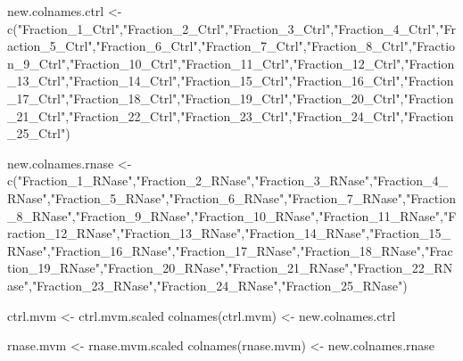 \documentclass[
]{article}
\newenvironment{Shaded}{\begin{snugshade}}{\end{snugshade}}
\newcommand{\FunctionTok}[1]{\textcolor[rgb]{0.00,0.00,0.00}{#1}}
\newcommand{\NormalTok}[1]{#1}
\newcommand{\OtherTok}[1]{\textcolor[rgb]{0.56,0.35,0.01}{#1}}
\newcommand{\StringTok}[1]{\textcolor[rgb]{0.31,0.60,0.02}{#1}}
\begin{document}
\begin{Shaded}
\begin{Highlighting}[]
\NormalTok{new.colnames.ctrl }\OtherTok{\textless{}{-}} \FunctionTok{c}\NormalTok{(}\StringTok{"Fraction\_1\_Ctrl"}\NormalTok{,}\StringTok{"Fraction\_2\_Ctrl"}\NormalTok{,}\StringTok{"Fraction\_3\_Ctrl"}\NormalTok{,}\StringTok{"Fraction\_4\_Ctrl"}\NormalTok{,}\StringTok{"Fraction\_5\_Ctrl"}\NormalTok{,}\StringTok{"Fraction\_6\_Ctrl"}\NormalTok{,}\StringTok{"Fraction\_7\_Ctrl"}\NormalTok{,}\StringTok{"Fraction\_8\_Ctrl"}\NormalTok{,}\StringTok{"Fraction\_9\_Ctrl"}\NormalTok{,}\StringTok{"Fraction\_10\_Ctrl"}\NormalTok{,}\StringTok{"Fraction\_11\_Ctrl"}\NormalTok{,}\StringTok{"Fraction\_12\_Ctrl"}\NormalTok{,}\StringTok{"Fraction\_13\_Ctrl"}\NormalTok{,}\StringTok{"Fraction\_14\_Ctrl"}\NormalTok{,}\StringTok{"Fraction\_15\_Ctrl"}\NormalTok{,}\StringTok{"Fraction\_16\_Ctrl"}\NormalTok{,}\StringTok{"Fraction\_17\_Ctrl"}\NormalTok{,}\StringTok{"Fraction\_18\_Ctrl"}\NormalTok{,}\StringTok{"Fraction\_19\_Ctrl"}\NormalTok{,}\StringTok{"Fraction\_20\_Ctrl"}\NormalTok{,}\StringTok{"Fraction\_21\_Ctrl"}\NormalTok{,}\StringTok{"Fraction\_22\_Ctrl"}\NormalTok{,}\StringTok{"Fraction\_23\_Ctrl"}\NormalTok{,}\StringTok{"Fraction\_24\_Ctrl"}\NormalTok{,}\StringTok{"Fraction\_25\_Ctrl"}\NormalTok{)}

\NormalTok{new.colnames.rnase }\OtherTok{\textless{}{-}} \FunctionTok{c}\NormalTok{(}\StringTok{"Fraction\_1\_RNase"}\NormalTok{,}\StringTok{"Fraction\_2\_RNase"}\NormalTok{,}\StringTok{"Fraction\_3\_RNase"}\NormalTok{,}\StringTok{"Fraction\_4\_RNase"}\NormalTok{,}\StringTok{"Fraction\_5\_RNase"}\NormalTok{,}\StringTok{"Fraction\_6\_RNase"}\NormalTok{,}\StringTok{"Fraction\_7\_RNase"}\NormalTok{,}\StringTok{"Fraction\_8\_RNase"}\NormalTok{,}\StringTok{"Fraction\_9\_RNase"}\NormalTok{,}\StringTok{"Fraction\_10\_RNase"}\NormalTok{,}\StringTok{"Fraction\_11\_RNase"}\NormalTok{,}\StringTok{"Fraction\_12\_RNase"}\NormalTok{,}\StringTok{"Fraction\_13\_RNase"}\NormalTok{,}\StringTok{"Fraction\_14\_RNase"}\NormalTok{,}\StringTok{"Fraction\_15\_RNase"}\NormalTok{,}\StringTok{"Fraction\_16\_RNase"}\NormalTok{,}\StringTok{"Fraction\_17\_RNase"}\NormalTok{,}\StringTok{"Fraction\_18\_RNase"}\NormalTok{,}\StringTok{"Fraction\_19\_RNase"}\NormalTok{,}\StringTok{"Fraction\_20\_RNase"}\NormalTok{,}\StringTok{"Fraction\_21\_RNase"}\NormalTok{,}\StringTok{"Fraction\_22\_RNase"}\NormalTok{,}\StringTok{"Fraction\_23\_RNase"}\NormalTok{,}\StringTok{"Fraction\_24\_RNase"}\NormalTok{,}\StringTok{"Fraction\_25\_RNase"}\NormalTok{)}

\NormalTok{ctrl.mvm }\OtherTok{\textless{}{-}}\NormalTok{ ctrl.mvm.scaled}
\FunctionTok{colnames}\NormalTok{(ctrl.mvm) }\OtherTok{\textless{}{-}}\NormalTok{ new.colnames.ctrl}

\NormalTok{rnase.mvm }\OtherTok{\textless{}{-}}\NormalTok{ rnase.mvm.scaled}
\FunctionTok{colnames}\NormalTok{(rnase.mvm) }\OtherTok{\textless{}{-}}\NormalTok{ new.colnames.rnase}
\end{Highlighting}
\end{Shaded}
\end{document}
